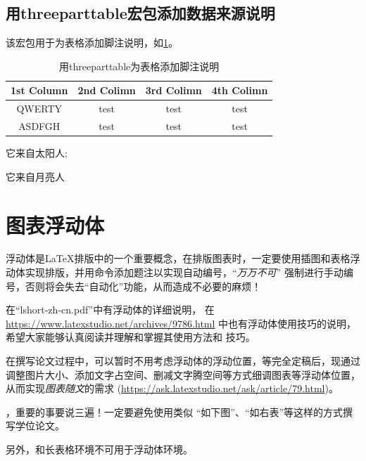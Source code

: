 \subsection{用threeparttable宏包添加数据来源说明}
该宏包用于为表格添加脚注说明，如\ref{tab:threeparttable}。

\begin{table}[htp]
  \caption{用threeparttable为表格添加脚注说明}
  \label{tab:threeparttable}
  \begin{threeparttable}
    \begin{tabular}{c c c c}
      \toprule
      1st Column & 2nd Colimn & 
      3rd Colimn & 4th Colimn \\
      \midrule
      QWERTY\tnote{1} & test & test & test \\
      ASDFGH\tnote{2} & test & test & test \\
      \bottomrule
    \end{tabular}
    \begin{tablenotes}
      \item[1] 它来自太阳人;
      \item[2] 它来自月亮人
    \end{tablenotes}
  \end{threeparttable}
\end{table}

\section{图表浮动体}

浮动体是\LaTeX{}排版中的一个重要概念，在排版图表时，一定要使用插图和表格浮
动体实现排版，并用命令添加题注以实现自动编号，\enquote{\emph{万万不可}}
强制进行手动编号，否则将会失去\enquote{自动化}功能，从而造成不必要的麻烦！

在\enquote{lshort-zh-cn.pdf}中有浮动体的详细说明，
在\url{https://www.latexstudio.net/archives/9786.html}
中也有浮动体使用技巧的说明，希望大家能够认真阅读并理解和掌握其使用方法和
技巧。

在撰写论文过程中，可以暂时不用考虑浮动体的浮动位置，等完全定稿后，现通过
调整图片大小、添加文字占空间、删减文字腾空间等方式细调图表等浮动体位置，
从而实现\emph{图表随文}的需求
(\url{https://ask.latexstudio.net/ask/article/79.html})。

，重要的事要说三遍！一定要避免使用类似
\enquote{如下图}、\enquote{如右表}等这样的方式撰写学位论文。

另外，和长表格环境不可用于浮动体环境。


